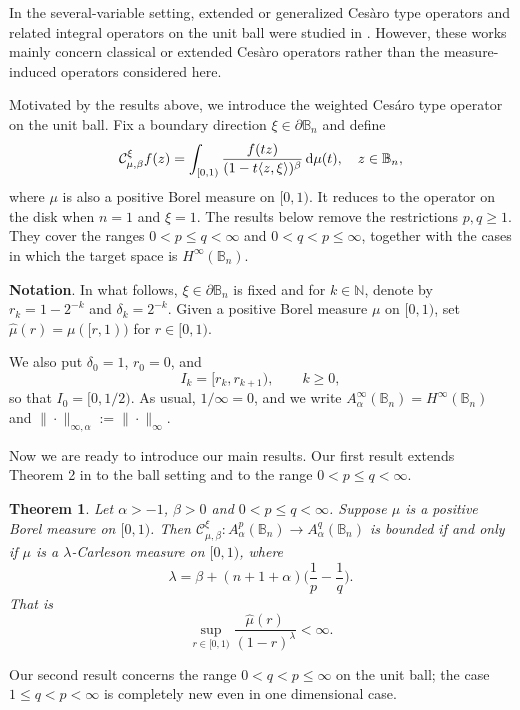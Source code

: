 \documentclass[preprint,12pt,times]{elsarticle}
\newtheorem{theorem}{Theorem}[section]
\theoremstyle{definition}
\theoremstyle{remark}
\numberwithin{equation}{section}
\begin{document}
In the several-variable setting, extended or generalized Ces\`aro type
operators and related integral operators on the unit ball were studied in
\cite{ChangLiStevic2007,Hu2003MixedNorm,Hu2004Bergman,LiStevic2009}. However, these works mainly concern classical or extended Ces\`aro operators rather than the measure-induced operators considered here.

Motivated by the results above, we introduce the weighted Ces\'aro type operator on the unit ball. Fix a boundary direction $\xi\in\partial\mathbb B_n$ and define
\[
    \mathcal C_{\mu,\beta}^{\xi}f(z)=\int_{[0,1)}\frac{f(tz)}{(1-t\langle z,\xi\rangle)^\beta}\,{\rm d}\mu(t),
    \quad z\in\mathbb B_n,
\] 
where $\mu $ is also a positive Borel measure on $[0,1)$.
It reduces to the operator on the disk when
$n=1$ and $\xi=1$.
The results below remove the restrictions $p,q\geq1$.  They cover the ranges
$0<p\leq q<\infty$ and $0<q<p\leq\infty$, together with the cases in which
the target space is $H^\infty(\mathbb B_n)$.
 

{\bf Notation}. In what follows, $\xi\in\partial\mathbb{B}_n$ is fixed and for $k\in \mathbb{N}$, denote by $r_k=1-2^{-k}$ and $\delta_k=2^{-k}$. Given a positive Borel measure $\mu$ on $[0,1)$, set $\hat{\mu}(r)=\mu([r,1))$ for $r\in [0,1)$.

 We also put $\delta_0=1$, $r_0=0$, and
\[
    I_k=[r_k,r_{k+1}),\qquad k\geq0,
\]
so that $I_0=[0,1/2)$.  As usual, $1/\infty=0$, and we write
$A_\alpha^\infty(\mathbb B_n)=H^\infty(\mathbb B_n)$ and
$\|\cdot\|_{\infty,\alpha}:=\|\cdot\|_\infty$.


 Now we are ready to introduce our main results. Our first result extends Theorem 2 in \cite{GSZ2025} to the ball setting  and to the range $0<p\leq q<\infty$.
\begin{theorem}\label{theorem1.1}
Let $\alpha>-1$, $\beta>0$ and   $0<p\leq q<\infty$. Suppose $\mu$ is a positive Borel measure on $[0,1)$. Then $\mathcal{C}_{\mu,\beta}^{\xi}: A_{\alpha}^p(\mathbb{B}_n)\to A_{\alpha}^q(\mathbb{B}_n)$ is bounded if and only if $\mu$ is a $\lambda$-Carleson measure on $[0,1)$, where \[
    \lambda=\beta+(n+1+\alpha)\Big(\frac{1}{p}-\frac{1}{q}\Big).
\] That is
\[
    \sup_{r\in [0,1)}\frac{\hat{\mu}(r)}{(1-r)^{\lambda}}<\infty.
\]
\end{theorem}

Our second result concerns the   range $0<q<p\leq\infty$ on the unit ball; the
case $1\leq q<p<\infty$  is completely new even in one
dimensional case.
\end{document}
